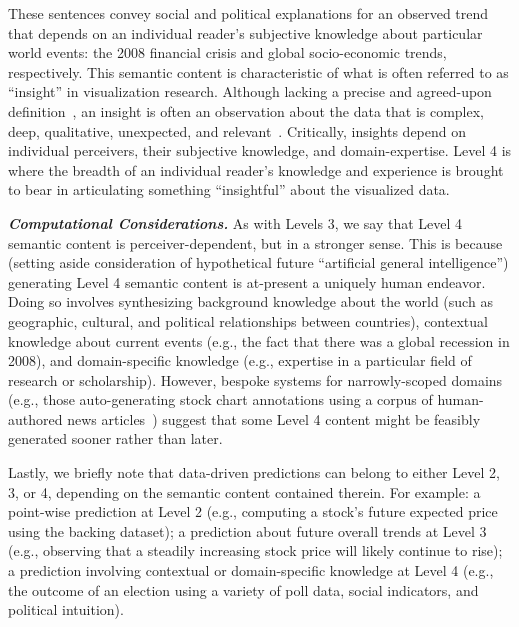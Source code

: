 \begin{quote}
    \small
    \textcolor{white}{}
    \vspace{-1mm}
\end{quote}

\noindent
These sentences convey social and political explanations for an observed trend that depends on an individual reader's subjective knowledge about particular world events: the 2008 financial crisis and global socio-economic trends, respectively.
This semantic content is characteristic of what is often referred to as ``insight'' in visualization research.
Although lacking a precise and agreed-upon definition~\cite{law_what_2020, tang_extracting_2017, north_toward_2006, chang_defining_2009, law_characterizing_2020}, an insight is often an observation about the data that is complex, deep, qualitative, unexpected, and relevant~\cite{yi_understanding_2008}.
Critically, insights depend on individual perceivers, their subjective knowledge, and domain-expertise.
Level 4 is where the breadth of an individual reader’s knowledge and experience is brought to bear in articulating something ``insightful'' about the visualized data.

\textbf{\emph{Computational Considerations.}}
{As with Levels 3, we say that Level 4 semantic content is perceiver-dependent, but in a stronger sense}. 
This is because (setting aside consideration of hypothetical future ``artificial general intelligence'') generating Level 4 semantic content is at-present a uniquely human endeavor.
Doing so involves synthesizing background knowledge about the world (such as geographic, cultural, and political relationships between countries), contextual knowledge about current events (e.g., the fact that there was a global recession in 2008), and domain-specific knowledge (e.g., expertise in a particular field of research or scholarship).
However, bespoke systems for narrowly-scoped domains (e.g., those auto-generating stock chart annotations using a corpus of human-authored news articles~\cite{hullman_contextifier_2013}) suggest that some Level 4 content might be feasibly generated sooner rather than later.

Lastly, we briefly note that data-driven predictions can belong to either Level 2, 3, or 4, depending on the semantic content contained therein.
For example: a point-wise prediction at Level 2 (e.g., computing a stock's future expected price using the backing dataset); a prediction about future overall trends at Level 3 (e.g., observing that a steadily increasing stock price will likely continue to rise); a prediction involving contextual or domain-specific knowledge at Level 4 (e.g., the outcome of an election using a variety of poll data, social indicators, and political intuition).
